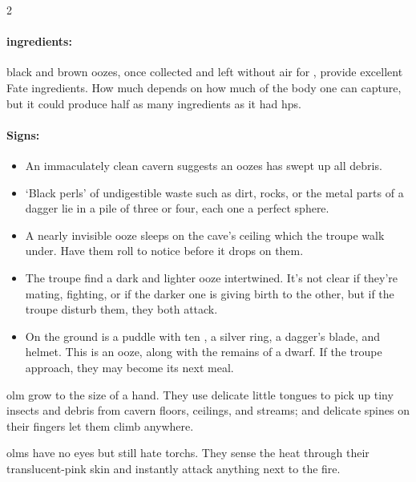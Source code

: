 \begin{multicols}{2}
\jelly

\paragraph{\Glspl{ingredient}:}
black and brown oozes, once collected and left without air for , provide excellent Fate \glspl{ingredient}.
How much depends on how much of the body one can capture, but it could produce half as many \glspl{ingredient} as it had \glspl{hp}.

\paragraph{Signs:}
\begin{itemize}
  \item
  An immaculately clean cavern suggests an oozes has swept up all debris.
  \item
  `Black perls' of undigestible waste such as dirt, rocks, or the metal parts of a dagger lie in a pile of three or four, each one a perfect sphere.
\end{itemize}

\showEnc

\begin{itemize}
  \item
  A nearly invisible ooze sleeps on the cave's ceiling which the troupe walk under.
  Have them roll  to notice before it drops on them.
  \item
  The troupe find a dark and lighter ooze intertwined.
  It's not clear if they're mating, fighting, or if the darker one is giving birth to the other, but if the troupe disturb them, they both attack.
  \item
  On the ground is a puddle with ten , a silver ring, a dagger's blade, and helmet.
  This is an ooze, along with the remains of a dwarf.
  If the troupe approach, they may become its next meal.
\end{itemize}

\jelly

  {olm}%
grow to the size of a hand.
They use delicate little tongues to pick up tiny insects and debris from cavern floors, ceilings, and streams; and delicate spines on their fingers let them climb anywhere.

\olmSwarm

\Glspl{olm} have no eyes but still hate \glspl{torch}.
They sense the heat through their translucent-pink skin and instantly attack anything next to the fire.


\end{multicols}
